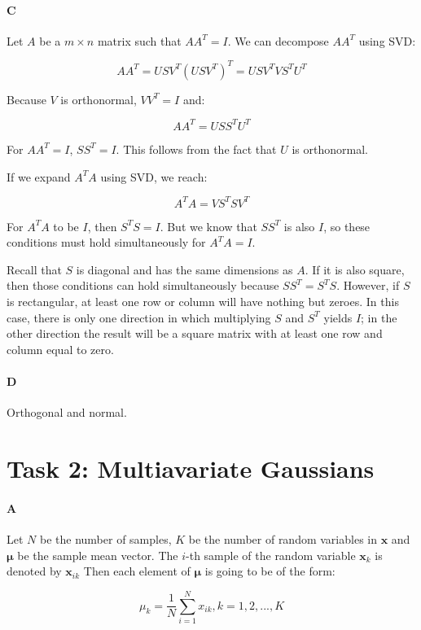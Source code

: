 \documentclass[12pt]{article}
\begin{document}
\paragraph{C}
Let $A$ be a $m \times n$ matrix such that $AA^T=I$. We can decompose $AA^T$ using SVD:

\[
AA^T = USV^T\left(USV^T\right)^T = USV^TVS^TU^T\]

Because $V$ is orthonormal, $VV^T=I$ and:

\[
AA^T = USS^TU^T
\]

For $AA^T=I$, $SS^T=I$. This follows from the fact that $U$ is orthonormal.

If we expand $A^TA$ using SVD, we reach:

\[
A^TA = VS^TSV^T
\]

For $A^TA$ to be $I$, then $S^TS=I$. But we know that $SS^T$ is also $I$, so these conditions must hold simultaneously for $A^TA=I$.

Recall that $S$ is diagonal and has the same dimensions as $A$. If it is also square, then those conditions can hold simultaneously because $SS^T=S^TS$. However, if $S$ is rectangular, at least one row or column will have nothing but zeroes. In this case, there is only one direction in which multiplying $S$ and $S^T$ yields $I$; in the other direction the result will be a square matrix with at least one row and column equal to zero.

\paragraph{D} Orthogonal and normal.

\section{Task 2: Multiavariate Gaussians}

\paragraph{A}
Let $N$ be the number of samples, $K$ be the number of random variables in $\mathbf{x}$ and $\mathbf{\mu}$ be the sample mean vector. The $i$-th sample of the random variable $\mathbf{x}_k$ is denoted by $\mathbf{x}_{ik}$ Then each element of $\mathbf{\mu}$ is going to be of the form:

\begin{equation}
\mu_k = \frac{1}{N}\displaystyle\sum_{i=1}^{N}{x_{ik}}, k=1,2,...,K
\end{equation}
\end{document}
